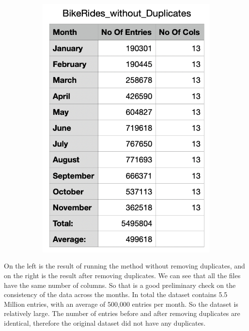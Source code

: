 \documentclass[12pt]{article}
\begin{document}
\begin{itemize}
\begin{figure}[h]
\begin{subfigure}{.4\textwidth}
		\includegraphics[scale=0.5]{img3.png}
	\end{subfigure}
	\end{figure}
	
On the left is the result of running the method without removing duplicates, and on the right is the result after removing duplicates. We can see that all the files have the same number of columns. So that is a good preliminary check on the consistency of the data across the months. In total the dataset contains 5.5 Million entries, with an average of 500,000 entries per month. So the dataset is relatively large. The number of entries before and after removing duplicates are identical, therefore the original dataset did not have any duplicates.
	
\end{itemize} 
\end{document}
